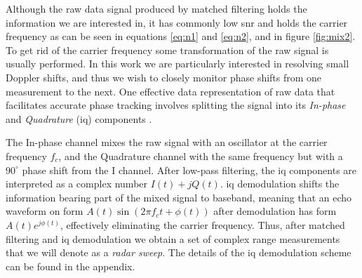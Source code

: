Although the raw data signal produced by matched filtering holds the information we are interested in, it has commonly low \gls{snr} \citep{richards_2014} and holds the carrier frequency as can be seen in equations \eqref{eq:n1} and \eqref{eq:n2}, and in figure \ref{fig:mix2}. To get rid of the carrier frequency some transformation of the raw signal is usually performed. In this work we are particularly interested in resolving small Doppler shifts, and thus we wish to closely monitor phase shifts from one measurement to the next. One effective data representation of raw data that facilitates accurate phase tracking involves splitting the signal into its \emph{In-phase} and \emph{Quadrature} (\gls{iq}) components \citep{lien_gillian_karagozler_amihood_schwesig_olson_raja_poupyrev_2016}. 

The In-phase channel mixes the raw signal with an oscillator at the carrier frequency $f_c$, and the Quadrature channel with the same frequency but with a $90^\circ$ phase shift from the I channel. After low-pass filtering, the \gls{iq} components are interpreted as a complex number $I(t) + jQ(t)$. \gls{iq} demodulation shifts the information bearing part of the mixed signal to baseband, meaning that an echo waveform on form $A(t)\sin(2\pi f_c t + \phi(t))$ after demodulation has form $A(t)e^{j\phi(t)}$, effectively eliminating the carrier frequency. Thus, after matched filtering and \gls{iq} demodulation we obtain a set of complex range measurements that we will denote as a \emph{radar sweep}. The details of the \gls{iq} demodulation scheme can be found in the appendix. 





